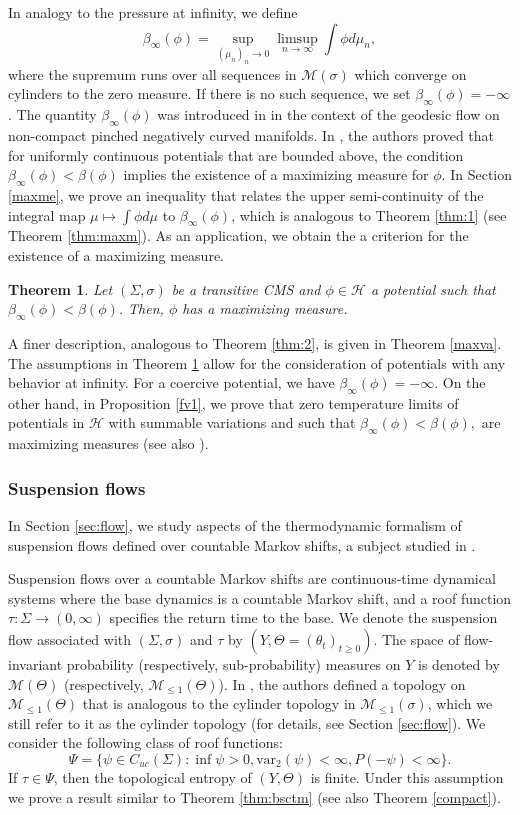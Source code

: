 \documentclass[letterpaper,11pt]{amsart}
\theoremstyle{plain}
\newtheorem{theorem}{Theorem}[section]
\theoremstyle{plain}
\theoremstyle{definition}
\theoremstyle{remark}
\def\M{{\mathcal M}}
\def\H{{\mathcal H}}
\begin{document}
In analogy to the pressure at infinity, we define
$$\beta_\infty(\phi)=\sup_{(\mu_n)_n\to0}\limsup_{n\to\infty}\int \phi d\mu_n,$$
where the supremum runs over all sequences in $\M(\sigma)$ which converge on cylinders to the zero measure. If there is no such sequence, we set $\beta_\infty(\phi)=-\infty$. The quantity $\beta_\infty(\phi)$ was introduced in \cite{rv2} in the context of the geodesic flow on non-compact pinched negatively curved manifolds. In \cite{rv2}, the authors proved that for uniformly continuous potentials that are bounded above, the condition $\beta_\infty(\phi)<\beta(\phi)$ implies the existence of a maximizing measure for $\phi$. In Section \ref{maxme}, we prove an inequality that relates the upper semi-continuity of the integral map $\mu\mapsto\int \phi d\mu$ to $\beta_\infty(\phi)$, which is analogous to Theorem \ref{thm:1} (see Theorem \ref{thm:maxm}). As an application, we obtain the a criterion for the existence of a maximizing measure.

\begin{theorem}\label{thm:mm} Let $(\Sigma,\sigma)$ be a transitive CMS and $\phi\in\H$ a potential such that $\beta_\infty(\phi)<\beta(\phi)$. Then, $\phi$ has a maximizing measure.
\end{theorem}

A finer description, analogous to Theorem \ref{thm:2}, is given in Theorem \ref{maxva}. The assumptions in Theorem \ref{thm:mm} allow for the consideration of  potentials with any behavior at infinity. For a coercive potential, we have $\beta_\infty(\phi)=-\infty$. On the other hand, in Proposition \ref{fv1}, we prove that zero temperature limits of potentials in $\H$ with summable variations and such that $\beta_\infty(\phi)<\beta(\phi),$ are maximizing measures (see also \cite[Theorem 1]{fv}).

\subsubsection{Suspension flows} In Section \ref{sec:flow}, we study aspects of the thermodynamic formalism of suspension flows defined over countable Markov shifts, a subject studied in \cite{bi, k, ij}. 

Suspension flows over a countable Markov shifts are continuous-time dynamical systems where the base dynamics is a countable Markov shift, and a roof function $\tau:\Sigma\to (0,\infty)$ specifies the return time to the base. We denote the suspension flow associated with $(\Sigma,\sigma)$ and $\tau$ by $(Y,\Theta=(\theta_t)_{t\ge 0})$. The space of flow-invariant probability (respectively, sub-probability) measures on $Y$ is denoted by $\M(\Theta)$ (respectively, $\M_{\le1}(\Theta)$). In \cite[Section 6]{iv}, the authors defined a topology on $\M_{\le1}(\Theta)$ that is analogous to the cylinder topology in $\M_{\le1}(\sigma)$, which we still refer to it as the cylinder topology (for details, see Section \ref{sec:flow}). We consider the following class of roof functions:
$$\Psi=\{\psi\in C_{uc}(\Sigma): \inf \psi>0, \text{var}_2(\psi)<\infty, P(-\psi)<\infty\}.$$
If $\tau\in\Psi$, then the topological entropy of $(Y,\Theta)$ is finite. Under this assumption we prove a result similar to Theorem \ref{thm:bsctm} (see also Theorem \ref{compact}). 
\end{document}
